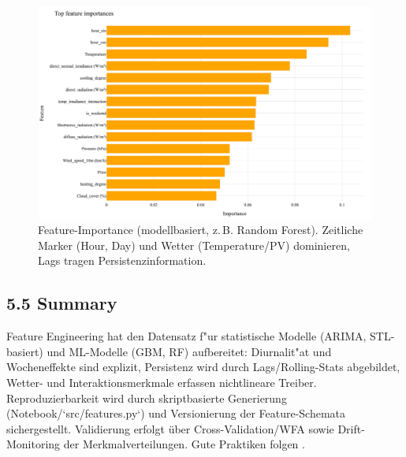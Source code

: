 \documentclass[12pt,a4paper]{article}
\begin{document}
\begin{figure}[H]
  \centering
  \includegraphics[width=0.95\linewidth]{figures/ml_feat_importance.png}
  \caption{Feature-Importance (modellbasiert, z.\,B. Random Forest). Zeitliche Marker (Hour, Day) und Wetter (Temperature/PV) dominieren, Lags tragen Persistenzinformation.}
  \label{fig:fe_importance}
\end{figure}

\subsection*{5.5 Summary}
Feature Engineering hat den Datensatz f{"u}r statistische Modelle (ARIMA, STL-basiert) und ML-Modelle (GBM, RF) aufbereitet: Diurnalit{"a}t und Wocheneffekte sind explizit, Persistenz wird durch Lags/Rolling-Stats abgebildet, Wetter- und Interaktionsmerkmale erfassen nichtlineare Treiber. Reproduzierbarkeit wird durch skriptbasierte Generierung (Notebook/`src/features.py`) und Versionierung der Feature-Schemata sichergestellt. Validierung erfolgt {\"u}ber Cross-Validation/WFA sowie Drift-Monitoring der Merkmalverteilungen. Gute Praktiken folgen \cite{Zheng2020,Hyndman2021}.

\printbibliography
\end{document}

